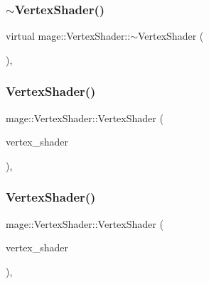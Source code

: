 \hypertarget{classmage_1_1_vertex_shader_a83e5bd464361b7f94f969475f1eeaf2a}{}\label{classmage_1_1_vertex_shader_a83e5bd464361b7f94f969475f1eeaf2a} 
\subsubsection{\texorpdfstring{$\sim$\+Vertex\+Shader()}{~VertexShader()}}
{\footnotesize\ttfamily virtual mage\+::\+Vertex\+Shader\+::$\sim$\+Vertex\+Shader (\begin{DoxyParamCaption}{ }\end{DoxyParamCaption})\hspace{0.3cm}{\ttfamily [virtual]}, {\ttfamily [default]}}

\hypertarget{classmage_1_1_vertex_shader_a713f8581278ea2e5eb3010207b7e42a8}{}\label{classmage_1_1_vertex_shader_a713f8581278ea2e5eb3010207b7e42a8} 
\subsubsection{\texorpdfstring{Vertex\+Shader()}{VertexShader()}\hspace{0.1cm}{\footnotesize\ttfamily [3/4]}}
{\footnotesize\ttfamily mage\+::\+Vertex\+Shader\+::\+Vertex\+Shader (\begin{DoxyParamCaption}\item[{const \hyperlink{classmage_1_1_vertex_shader}{Vertex\+Shader} \&}]{vertex\+\_\+shader }\end{DoxyParamCaption})\hspace{0.3cm}{\ttfamily [private]}, {\ttfamily [delete]}}

\hypertarget{classmage_1_1_vertex_shader_ad3bd5ca377ec161cdb670753774ede5c}{}\label{classmage_1_1_vertex_shader_ad3bd5ca377ec161cdb670753774ede5c} 
\subsubsection{\texorpdfstring{Vertex\+Shader()}{VertexShader()}\hspace{0.1cm}{\footnotesize\ttfamily [4/4]}}
{\footnotesize\ttfamily mage\+::\+Vertex\+Shader\+::\+Vertex\+Shader (\begin{DoxyParamCaption}\item[{\hyperlink{classmage_1_1_vertex_shader}{Vertex\+Shader} \&\&}]{vertex\+\_\+shader }\end{DoxyParamCaption})\hspace{0.3cm}{\ttfamily [private]}, {\ttfamily [delete]}}



